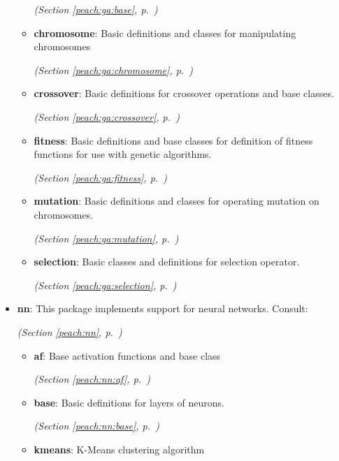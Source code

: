 \begin{itemize}
\begin{itemize}
  \textit{(Section \ref{peach:ga:base}, p.~\pageref{peach:ga:base})}

    \item \textbf{chromosome}: 
Basic definitions and classes for manipulating chromosomes


  \textit{(Section \ref{peach:ga:chromosome}, p.~\pageref{peach:ga:chromosome})}

    \item \textbf{crossover}: 
Basic definitions for crossover operations and base classes.


  \textit{(Section \ref{peach:ga:crossover}, p.~\pageref{peach:ga:crossover})}

    \item \textbf{fitness}: 
Basic definitions and base classes for definition of fitness functions for use
with genetic algorithms.


  \textit{(Section \ref{peach:ga:fitness}, p.~\pageref{peach:ga:fitness})}

    \item \textbf{mutation}: 
Basic definitions and classes for operating mutation on chromosomes.


  \textit{(Section \ref{peach:ga:mutation}, p.~\pageref{peach:ga:mutation})}

    \item \textbf{selection}: 
Basic classes and definitions for selection operator.


  \textit{(Section \ref{peach:ga:selection}, p.~\pageref{peach:ga:selection})}

  \end{itemize}
\item \textbf{nn}: 
This package implements support for neural networks. Consult:


  \textit{(Section \ref{peach:nn}, p.~\pageref{peach:nn})}

  \begin{itemize}
\setlength{\parskip}{0ex}
    \item \textbf{af}: 
Base activation functions and base class


  \textit{(Section \ref{peach:nn:af}, p.~\pageref{peach:nn:af})}

    \item \textbf{base}: 
Basic definitions for layers of neurons.


  \textit{(Section \ref{peach:nn:base}, p.~\pageref{peach:nn:base})}

    \item \textbf{kmeans}: 
K-Means clustering algorithm



\end{itemize}
\end{itemize}

